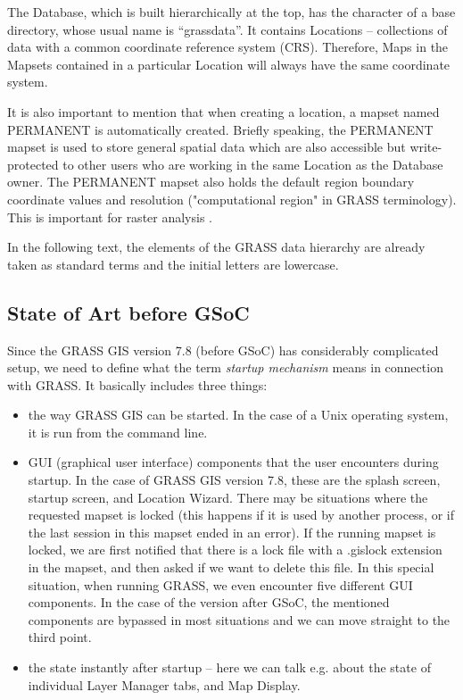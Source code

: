 \documentclass[a4paper,10pt,twoside]{article}
\begin{document}
\noindent The Database, which is built hierarchically at the top, has
the character of a base directory, whose usual name is
``grassdata''. It contains Locations -- collections of data with a
common coordinate reference system (CRS). Therefore, Maps in the
Mapsets contained in a particular Location will always have the same
coordinate system.

It is also important to mention that when creating a location, a
mapset named PERMANENT is automatically created. Briefly speaking, the
PERMANENT mapset is used to store general spatial data which are also
accessible but write-protected to other users who are working in the
same Location as the Database owner. The PERMANENT mapset also holds
the default region boundary coordinate values and resolution 
("computational region" in GRASS terminology). 
This is important for raster analysis \cite{hierarchy}.

In the following text, the elements of the GRASS data hierarchy are
already taken as standard terms and the initial letters are lowercase.

\newpage
\vspace*{-1cm}
\subsection{State of Art before GSoC}
\label{sec:beforeGSoC}

\noindent Since the GRASS GIS version 7.8 (before GSoC) has
considerably complicated setup, we need to define what the term
\textit{startup mechanism} means in connection with GRASS. It
basically includes three things:

\begin {itemize}

\item the way GRASS GIS can be started. In the case of a Unix
  operating system, it is run from the command line.

\item GUI (graphical user interface) components that the user
  encounters during startup. In the case of GRASS GIS version 7.8,
  these are the splash screen, startup screen, and Location
  Wizard. There may be situations where the requested mapset is locked
  (this happens if it is used by another process, or if the last
  session in this mapset ended in an error). If the running mapset is
  locked, we are first notified that there is a lock file with a
  .gislock extension in the mapset, and then asked if we want to
  delete this file. In this special situation, when running GRASS, we
  even encounter five different GUI components.  In the case of the
  version after GSoC, the mentioned components are bypassed in most
  situations and we can move straight to the third point.

\item the state instantly after startup -- here we can talk e.g. about
  the state of individual Layer Manager tabs, and Map Display.

\end{itemize}
\end{document}
